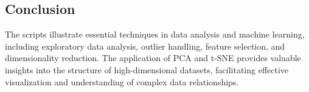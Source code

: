 \documentclass{article}
\begin{document}
\subsection{Conclusion}
The scripts illustrate essential techniques in data analysis and machine learning, including exploratory data analysis, outlier handling, feature selection, and dimensionality reduction. The application of PCA and t-SNE provides valuable insights into the structure of high-dimensional datasets, facilitating effective visualization and understanding of complex data relationships.

\end{document}
